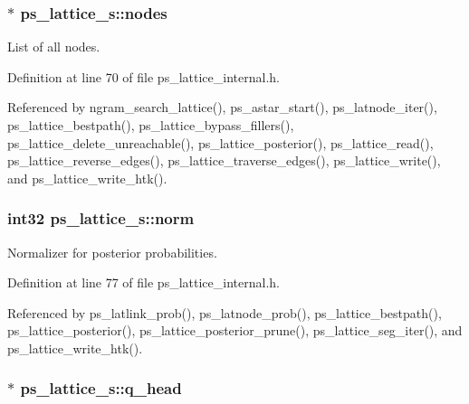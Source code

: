 \subsubsection[{nodes}]{$\ast$ ps\-\_\-lattice\-\_\-s\-::nodes}\label{structps__lattice__s_a838bd9223e35d012419e6225b54e393d}


List of all nodes. 



Definition at line 70 of file ps\-\_\-lattice\-\_\-internal.\-h.



Referenced by ngram\-\_\-search\-\_\-lattice(), ps\-\_\-astar\-\_\-start(), ps\-\_\-latnode\-\_\-iter(), ps\-\_\-lattice\-\_\-bestpath(), ps\-\_\-lattice\-\_\-bypass\-\_\-fillers(), ps\-\_\-lattice\-\_\-delete\-\_\-unreachable(), ps\-\_\-lattice\-\_\-posterior(), ps\-\_\-lattice\-\_\-read(), ps\-\_\-lattice\-\_\-reverse\-\_\-edges(), ps\-\_\-lattice\-\_\-traverse\-\_\-edges(), ps\-\_\-lattice\-\_\-write(), and ps\-\_\-lattice\-\_\-write\-\_\-htk().

\subsubsection[{norm}]{\setlength{\rightskip}{0pt plus 5cm}int32 ps\-\_\-lattice\-\_\-s\-::norm}\label{structps__lattice__s_a68c3259613a16628e1dd2e8147705d8e}


Normalizer for posterior probabilities. 



Definition at line 77 of file ps\-\_\-lattice\-\_\-internal.\-h.



Referenced by ps\-\_\-latlink\-\_\-prob(), ps\-\_\-latnode\-\_\-prob(), ps\-\_\-lattice\-\_\-bestpath(), ps\-\_\-lattice\-\_\-posterior(), ps\-\_\-lattice\-\_\-posterior\-\_\-prune(), ps\-\_\-lattice\-\_\-seg\-\_\-iter(), and ps\-\_\-lattice\-\_\-write\-\_\-htk().

\subsubsection[{q\-\_\-head}]{$\ast$ ps\-\_\-lattice\-\_\-s\-::q\-\_\-head}\label{structps__lattice__s_a26c029189074db2f668d5a9d67eb7af5}


